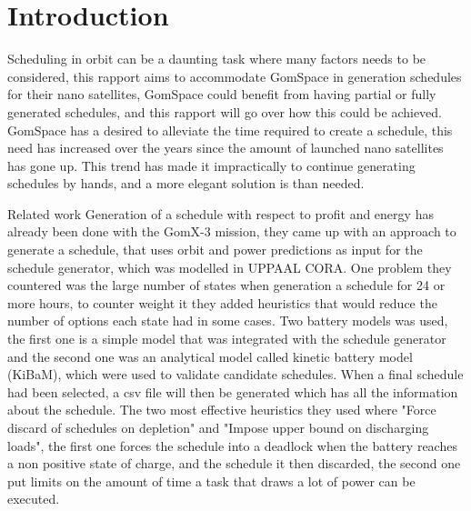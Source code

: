 \chapter{Introduction}\label{cha:intro}
Scheduling in orbit can be a daunting task where many factors needs to be considered, this rapport aims to accommodate GomSpace in generation schedules for their nano satellites, GomSpace could benefit from having partial or fully generated schedules, and this rapport will go over how this could be achieved. GomSpace has a desired to alleviate the time required to create a schedule, this need has increased over the years since the amount of launched nano satellites has gone up. This trend has made it impractically to continue generating schedules by hands, and a more elegant solution is than needed.

Related work %
Generation of a schedule with respect to profit and energy has already been done with the GomX-3 mission, they came up with an approach to generate a schedule, that uses orbit and power predictions as input for the schedule generator, which was modelled in UPPAAL CORA. One problem they countered was the large number of states when generation a schedule for 24 or more hours, to counter weight it they added heuristics that would reduce the number of options each state had in some cases. Two battery models was used, the first one is a simple model that was integrated with the schedule generator and the second one was an analytical model called kinetic battery model (KiBaM), which were used to validate candidate schedules. When a final schedule had been selected, a csv file will then be generated which has all the information about the schedule. The two most effective heuristics they used where "Force discard of schedules on depletion" and "Impose upper bound on discharging loads", the first one forces the schedule into a deadlock when the battery reaches a non positive state of charge, and the schedule it then discarded, the second one put limits on the amount of time a task that draws a lot of power can be executed.%

